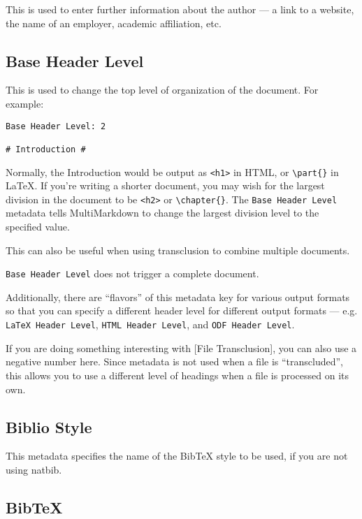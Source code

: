 This is used to enter further information about the author --- a link to a
website, the name of an employer, academic affiliation, etc.

\subsection{Base Header Level }
\label{baseheaderlevel}

This is used to change the top level of organization of the document. For example:

\begin{verbatim}
Base Header Level: 2

# Introduction #
\end{verbatim}

Normally, the Introduction would be output as \texttt{<h1>} in HTML, or \texttt{\textbackslash{}part\{\}} in LaTeX. If you're writing a shorter document, you may wish for the largest division in the document to be \texttt{<h2>} or \texttt{\textbackslash{}chapter\{\}}. The \texttt{Base Header Level} metadata tells MultiMarkdown to change the largest division level to the specified value.

This can also be useful when using transclusion to combine multiple documents.

\texttt{Base Header Level} does not trigger a complete document.

Additionally, there are ``flavors'' of this metadata key for various output formats so that you can specify a different header level for different output formats --- e.g. \texttt{LaTeX Header Level}, \texttt{HTML Header Level}, and \texttt{ODF Header Level}.

If you are doing something interesting with {[File Transclusion]}, you can also use a negative number here. Since metadata is not used when a file is ``transcluded'', this allows you to use a different level of headings when a file is processed on its own.

\subsection{Biblio Style }
\label{bibliostyle}

This metadata specifies the name of the BibTeX style to be used, if you are
not using natbib.

\subsection{BibTeX }
\label{bibtex}


